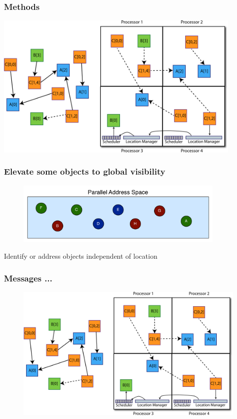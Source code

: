 \begin{frame}
  \frametitle{Methods}
  \begin{center}\includegraphics[width=0.9\textwidth]{../figures/elements2.pdf}\end{center}
\end{frame}


\begin{frame}
  \frametitle{Elevate some objects to global visibility}
  \begin{figure}\includegraphics[width=0.9\textwidth]{../figures/objectGlobalAddress.pdf}\end{figure}
  \pause
  \begin{block}{}
  Identify or address objects independent of location
  \end{block}
\end{frame}


\begin{frame}
  \frametitle{Messages ...
  }
  \begin{figure}
  \includegraphics[trim=0in 0in 14in 2in, clip=true, height=0.85\textheight]{../figures/elements2.pdf}
  \end{figure}
\end{frame}



